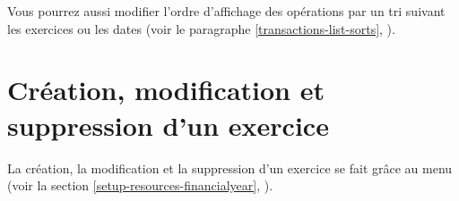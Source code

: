 Vous pourrez aussi modifier l'ordre d'affichage des opérations par un \gls{tri} suivant les exercices ou les dates (voir le paragraphe \vref{transactions-list-sorts}, ).


\section{Création, modification et suppression d'un exercice}


La création, la modification et la suppression d'un exercice se fait grâce au menu  (voir la section \vref{setup-resources-financialyear}, ).














